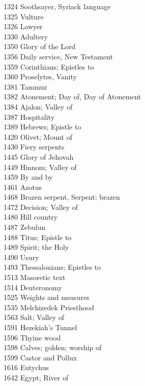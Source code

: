 1324 \quad Soothsayer, Syriack language\\
1325 \quad Vulture\\
1326 \quad Lawyer\\
1330 \quad Adultery\\
1350 \quad Glory of the Lord\\
1356 \quad Daily service, New Testament\\
1359 \quad Corinthians; Epistles to\\
1360 \quad Proselytes, Vanity\\
1381 \quad Tammuz\\
1382 \quad Atonement; Day of, Day of Atonement\\
1384 \quad Ajalon; Valley of\\
1387 \quad Hospitality\\
1389 \quad Hebrews; Epistle to\\
1420 \quad Olivet; Mount of\\
1430 \quad Fiery serpents\\
1445 \quad Glory of Jehovah\\
1449 \quad Hinnom; Valley of\\
1459 \quad By and by\\
1461 \quad Azotus\\
1468 \quad Brazen serpent, Serpent; brazen\\
1472 \quad Decision; Valley of\\
1480 \quad Hill country\\
1487 \quad Zebulun\\
1488 \quad Titus; Epistle to\\
1489 \quad Spirit; the Holy\\
1490 \quad Usury\\
1493 \quad Thessalonians; Epistles to\\
1513 \quad Masoretic text\\
1514 \quad Deuteronomy\\
1525 \quad Weights and measures\\
1535 \quad Melchizedek Priesthood\\
1563 \quad Salt; Valley of\\
1591 \quad Hezekiah’s Tunnel\\
1596 \quad Thyine wood\\
1598 \quad Calves; golden; worship of\\
1599 \quad Castor and Pollux\\
1616 \quad Eutychus\\
1642 \quad Egypt; River of\\
